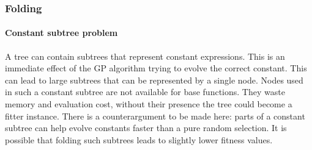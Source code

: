 \subsubsection{Folding}\label{secconstfolding}

\paragraph{Constant subtree problem}
A tree can contain subtrees that represent constant expressions. This is an immediate effect of the GP algorithm trying to evolve the correct constant. This can lead to large subtrees that can be represented by a single node. Nodes used in such a constant subtree are not available for base functions. They waste memory and evaluation cost, without their presence the tree could become a fitter instance. 
There is a counterargument to be made here: parts of a constant subtree can help evolve constants faster than a pure random selection. It is possible that folding such subtrees leads to slightly lower fitness values.

